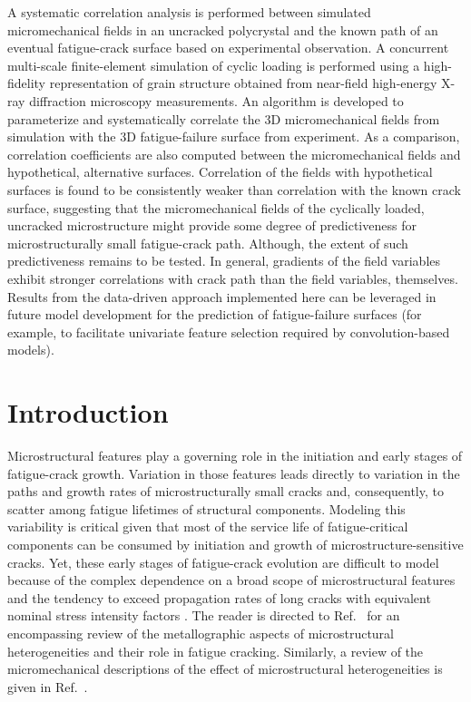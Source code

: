 A systematic correlation analysis is performed between simulated micromechanical fields in an uncracked polycrystal and the known path of an eventual fatigue-crack surface based on experimental observation. A concurrent multi-scale finite-element simulation of cyclic loading is performed using a high-fidelity representation of grain structure obtained from near-field high-energy X-ray diffraction microscopy measurements. An algorithm is developed to parameterize and systematically correlate the 3D micromechanical fields from simulation with the 3D fatigue-failure surface from experiment. As a comparison, correlation coefficients are also computed between the micromechanical fields and hypothetical, alternative surfaces. Correlation of the fields with hypothetical surfaces is found to be consistently weaker than correlation with the known crack surface, suggesting that the micromechanical fields of the cyclically loaded, uncracked microstructure might provide some degree of predictiveness for microstructurally small fatigue-crack path. Although, the extent of such predictiveness remains to be tested. In general, gradients of the field variables exhibit stronger correlations with crack path than the field variables, themselves. Results from the data-driven approach implemented here can be leveraged in future model development for the prediction of fatigue-failure surfaces (for example, to facilitate univariate feature selection required by convolution-based models).

\section{Introduction}
Microstructural features play a governing role in the initiation and early stages of fatigue-crack growth. Variation in those features leads directly to variation in the paths and growth rates of microstructurally small cracks and, consequently, to scatter among fatigue lifetimes of structural components. Modeling this variability is critical given that most of the service life of fatigue-critical components can be consumed by initiation and growth of microstructure-sensitive cracks. Yet, these early stages of fatigue-crack evolution are difficult to model because of the complex dependence on a broad scope of microstructural features and the tendency to exceed propagation rates of long cracks with equivalent nominal stress intensity factors \cite{Ritchie_1986}. The reader is directed to Ref.~\cite{Murty_2017} for an encompassing review of the metallographic aspects of microstructural heterogeneities and their role in fatigue cracking. Similarly, a review of the micromechanical descriptions of the effect of microstructural heterogeneities is given in Ref.~\cite{Mughrabi_2014}.


